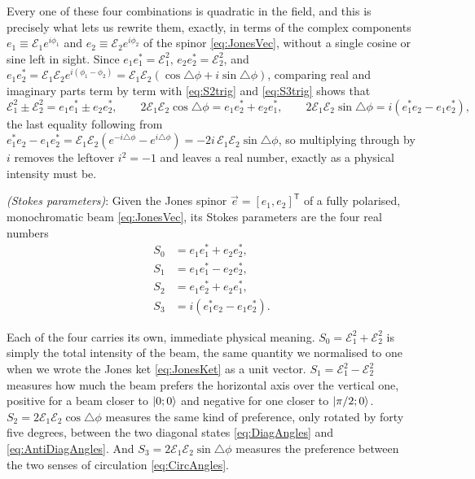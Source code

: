         Every one of these four combinations is quadratic in the field, and this is precisely what lets us rewrite them, exactly, in terms of the complex components $e_1\equiv\mathcal E_1e^{i\phi_1}$ and $e_2\equiv\mathcal E_2e^{i\phi_2}$ of the spinor \ref{eq:JonesVec}, without a single cosine or sine left in sight. Since $e_1e_1^*=\mathcal E_1^2$, $e_2e_2^*=\mathcal E_2^2$, and $e_1e_2^*=\mathcal E_1\mathcal E_2e^{i(\phi_1-\phi_2)}=\mathcal E_1\mathcal E_2\left(\cos\triangle\phi+i\sin\triangle\phi\right)$, comparing real and imaginary parts term by term with \ref{eq:S2trig} and \ref{eq:S3trig} shows that
        \begin{equation*}
            \mathcal E_1^2\pm\mathcal E_2^2 = e_1e_1^*\pm e_2e_2^*, \qquad 2\mathcal E_1\mathcal E_2\cos\triangle\phi = e_1e_2^*+e_2e_1^*, \qquad 2\mathcal E_1\mathcal E_2\sin\triangle\phi = i\left(e_1^*e_2-e_1e_2^*\right),
        \end{equation*}
        the last equality following from $e_1^*e_2-e_1e_2^*=\mathcal E_1\mathcal E_2\left(e^{-i\triangle\phi}-e^{i\triangle\phi}\right)=-2i\,\mathcal E_1\mathcal E_2\sin\triangle\phi$, so multiplying through by $i$ removes the leftover $i^2=-1$ and leaves a real number, exactly as a physical intensity must be.

        \begin{myDef}
            \textit{(Stokes parameters)}: Given the Jones spinor $\vec e=[e_1,e_2]^{\mathsf T}$ of a fully polarised, monochromatic beam \ref{eq:JonesVec}, its Stokes parameters are the four real numbers
            \begin{align}
                S_0 &= e_1e_1^*+e_2e_2^*, \label{eq:StokesS0}\\
                S_1 &= e_1e_1^*-e_2e_2^*, \label{eq:StokesS1}\\
                S_2 &= e_1e_2^*+e_2e_1^*, \label{eq:StokesS2}\\
                S_3 &= i\left(e_1^*e_2-e_1e_2^*\right). \label{eq:StokesS3}
            \end{align}
        \end{myDef}

        Each of the four carries its own, immediate physical meaning. $S_0=\mathcal E_1^2+\mathcal E_2^2$ is simply the total intensity of the beam, the same quantity we normalised to one when we wrote the Jones ket \ref{eq:JonesKet} as a unit vector. $S_1=\mathcal E_1^2-\mathcal E_2^2$ measures how much the beam prefers the horizontal axis over the vertical one, positive for a beam closer to $\ket{0;0}$ and negative for one closer to $\ket{\pi/2;0}$. $S_2=2\mathcal E_1\mathcal E_2\cos\triangle\phi$ measures the same kind of preference, only rotated by forty five degrees, between the two diagonal states \ref{eq:DiagAngles} and \ref{eq:AntiDiagAngles}. And $S_3=2\mathcal E_1\mathcal E_2\sin\triangle\phi$ measures the preference between the two senses of circulation \ref{eq:CircAngles}.

